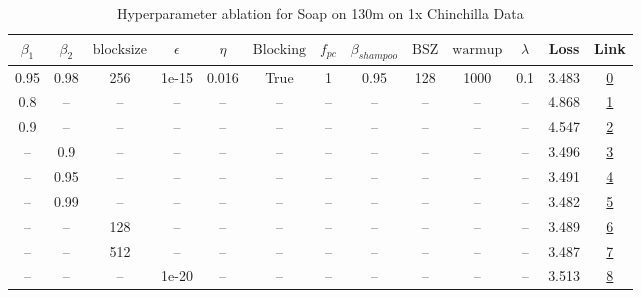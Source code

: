 \begin{table}[H]
\centering
\caption{Hyperparameter ablation for Soap on 130m on 1x Chinchilla Data}
\label{tab:ablation_soap_130m_1}
\begin{tabular}{ccccccccccccc}
\toprule
$\beta_1$ & $\beta_2$ & $\mathrm{block size}$ & $\epsilon$ & $\eta$ & $\mathrm{Blocking}$ & $f_{pc}$ & $\beta_{shampoo}$ & $\mathrm{BSZ}$ & $\mathrm{warmup}$ & $\lambda$ & Loss & Link \\
\midrule
0.95 & 0.98 & 256 & 1e-15 & 0.016 & True & 1 & 0.95 & 128 & 1000 & 0.1 & 3.483 & \href{https://wandb.ai/stanford-mercury/optimizer-scaling/runs/sweep-130m-2B-soaplff7de8lr0.016-wd0.1-minlr0-warmup1000-b10.95--f08df8}{0} \\
\midrule
0.8 & -- & -- & -- & -- & -- & -- & -- & -- & -- & -- & 4.868 & \href{https://wandb.ai/stanford-mercury/optimizer-scaling/runs/sweep-130m-2B-soapl0e72d4lr0.016-wd0.1-minlr0-warmup1000-b10.8-b-24a77a}{1} \\
0.9 & -- & -- & -- & -- & -- & -- & -- & -- & -- & -- & 4.547 & \href{https://wandb.ai/stanford-mercury/optimizer-scaling/runs/sweep-130m-2B-soaplf498b0lr0.016-wd0.1-minlr0-warmup1000-b10.9-b-a0623f}{2} \\
-- & 0.9 & -- & -- & -- & -- & -- & -- & -- & -- & -- & 3.496 & \href{https://wandb.ai/stanford-mercury/optimizer-scaling/runs/sweep-130m-2B-soaple0af61lr0.016-wd0.1-minlr0-warmup1000-b10.95--e189bd}{3} \\
-- & 0.95 & -- & -- & -- & -- & -- & -- & -- & -- & -- & 3.491 & \href{https://wandb.ai/stanford-mercury/optimizer-scaling/runs/sweep-130m-2B-soapl8015a9lr0.016-wd0.1-minlr0-warmup1000-b10.95--a9e9d5}{4} \\
-- & 0.99 & -- & -- & -- & -- & -- & -- & -- & -- & -- & 3.482 & \href{https://wandb.ai/stanford-mercury/optimizer-scaling/runs/sweep-130m-2B-soapla4071flr0.016-wd0.1-minlr0-warmup1000-b10.95--f307f3}{5} \\
-- & -- & 128 & -- & -- & -- & -- & -- & -- & -- & -- & 3.489 & \href{https://wandb.ai/stanford-mercury/optimizer-scaling/runs/sweep-130m-2B-soaplc51c66lr0.016-wd0.1-minlr0-warmup1000-b10.95--a8e71b}{6} \\
-- & -- & 512 & -- & -- & -- & -- & -- & -- & -- & -- & 3.487 & \href{https://wandb.ai/stanford-mercury/optimizer-scaling/runs/sweep-130m-2B-soapl55f9b8lr0.016-wd0.1-minlr0-warmup1000-b10.95--e77aea}{7} \\
-- & -- & -- & 1e-20 & -- & -- & -- & -- & -- & -- & -- & 3.513 & \href{https://wandb.ai/stanford-mercury/optimizer-scaling/runs/sweep-130m-2B-soapl69eb3flr0.016-wd0.1-minlr0-warmup1000-b10.95--7af120}{8} \\

\end{tabular}
\end{table}
